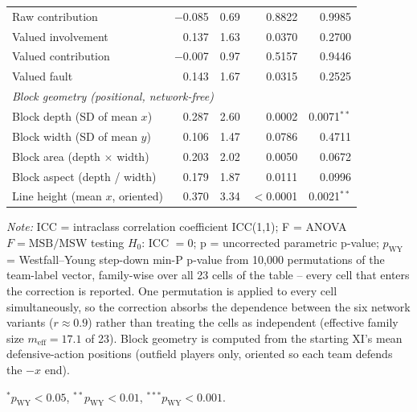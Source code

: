 \begin{table}[ht]
\begin{tabular}{lrrrr}
\quad Raw contribution & $-$0.085 & 0.69 & 0.8822 & 0.9985 \\
\quad Valued involvement & 0.137 & 1.63 & 0.0370 & 0.2700 \\
\quad Valued contribution & $-$0.007 & 0.97 & 0.5157 & 0.9446 \\
\quad Valued fault & 0.143 & 1.67 & 0.0315 & 0.2525 \\
\midrule
\multicolumn{5}{l}{\textit{Block geometry (positional, network-free)}} \\
\quad Block depth (SD of mean $x$) & 0.287 & 2.60 & 0.0002 & 0.0071$^{**}$ \\
\quad Block width (SD of mean $y$) & 0.106 & 1.47 & 0.0786 & 0.4711 \\
\quad Block area (depth $\times$ width) & 0.203 & 2.02 & 0.0050 & 0.0672 \\
\quad Block aspect (depth / width) & 0.179 & 1.87 & 0.0111 & 0.0996 \\
\quad Line height (mean $x$, oriented) & 0.370 & 3.34 & $<$0.0001 & 0.0021$^{**}$ \\
\bottomrule
\end{tabular}

\vspace{0.9ex}
\begin{minipage}{0.96\linewidth}
\footnotesize
\textit{Note:} ICC = intraclass correlation coefficient ICC(1,1);
F = ANOVA $F=\mathrm{MSB}/\mathrm{MSW}$ testing $H_0$: ICC $=0$;
p = uncorrected parametric p-value; $p_{\mathrm{WY}}$ = Westfall--Young step-down
min-P p-value from 10,000 permutations of the team-label vector, family-wise over
all 23 cells of the table -- every cell that enters the correction is
reported. One permutation is applied to every cell simultaneously, so the
correction absorbs the dependence between the six network variants
($r\approx0.9$) rather than treating the cells as independent (effective family
size $m_{\mathrm{eff}}=17.1$ of 23).
Block geometry is computed from the starting XI's mean defensive-action positions
(outfield players only, oriented so each team defends the $-x$ end).
\par\smallskip
$^{*}p_{\mathrm{WY}}<0.05$, $^{**}p_{\mathrm{WY}}<0.01$, $^{***}p_{\mathrm{WY}}<0.001$.
\end{minipage}
\end{table}
